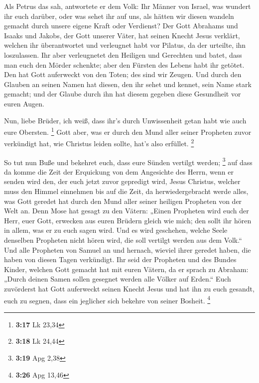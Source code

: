  Als Petrus das sah, antwortete er dem Volk: Ihr Männer
von Israel, was wundert ihr euch darüber, oder was sehet ihr auf uns,
als hätten wir diesen wandeln gemacht durch unsere eigene Kraft oder
Verdienst?  Der Gott Abrahams und Isaaks und Jakobs, der
Gott unserer Väter, hat seinen Knecht Jesus verklärt, welchen ihr
überantwortet und verleugnet habt vor Pilatus, da der urteilte, ihn
loszulassen.  Ihr aber verleugnetet den Heiligen und
Gerechten und batet, dass man euch den Mörder schenkte; 
aber den Fürsten des Lebens habt ihr getötet. Den hat Gott auferweckt
von den Toten; des sind wir Zeugen.  Und durch den
Glauben an seinen Namen hat diesen, den ihr sehet und kennet, sein Name
stark gemacht; und der Glaube durch ihn hat diesem gegeben diese
Gesundheit vor euren Augen.

 Nun, liebe Brüder, ich weiß, dass ihr's durch
Unwissenheit getan habt wie auch eure Obersten. \footnote{\textbf{3:17}
  Lk 23,34}  Gott aber, was er durch den Mund aller
seiner Propheten zuvor verkündigt hat, wie Christus leiden sollte, hat's
also erfüllet. \footnote{\textbf{3:18} Lk 24,44}

 So tut nun Buße und bekehret euch, dass eure Sünden
vertilgt werden; \footnote{\textbf{3:19} Apg 2,38}  auf
dass da komme die Zeit der Erquickung von dem Angesichte des Herrn, wenn
er senden wird den, der euch jetzt zuvor gepredigt wird, Jesus Christus,
 welcher muss den Himmel einnehmen bis auf die Zeit, da
herwiedergebracht werde alles, was Gott geredet hat durch den Mund aller
seiner heiligen Propheten von der Welt an.  Denn Mose hat
gesagt zu den Vätern: „Einen Propheten wird euch der Herr, euer Gott,
erwecken aus euren Brüdern gleich wie mich; den sollt ihr hören in
allem, was er zu euch sagen wird.  Und es wird geschehen,
welche Seele denselben Propheten nicht hören wird, die soll vertilgt
werden aus dem Volk.``  Und alle Propheten von Samuel an
und hernach, wieviel ihrer geredet haben, die haben von diesen Tagen
verkündigt.  Ihr seid der Propheten und des Bundes
Kinder, welchen Gott gemacht hat mit euren Vätern, da er sprach zu
Abraham: „Durch deinen Samen sollen gesegnet werden alle Völker auf
Erden.``  Euch zuvörderst hat Gott auferweckt seinen
Knecht Jesus und hat ihn zu euch gesandt, euch zu segnen, dass ein
jeglicher sich bekehre von seiner Bosheit. \footnote{\textbf{3:26} Apg
  13,46}

